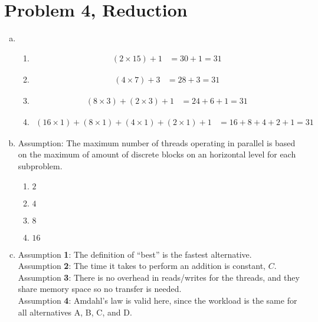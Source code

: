 \documentclass[fontsize=11pt, paper=a4, titlepage]{article}
\begin{document}
\section{Problem 4, Reduction}
\begin{enumerate}[a)]
    \item \begin{enumerate}[A]
        \item \begin{align*}
            (2\times 15) + 1 &= 30 + 1 = 31
        \end{align*}

        \item \begin{align*}
            (4\times 7) + 3 &= 28 + 3 = 31
        \end{align*}

        \item \begin{align*}
            (8\times 3) + (2\times 3) + 1 &= 24 + 6 + 1 = 31
        \end{align*}

        \item \begin{align*}
            (16\times 1) + (8\times 1) + (4\times 1) + (2\times 1) + 1 &=
            16 + 8 + 4 + 2 + 1 = 31
        \end{align*}
    \end{enumerate}

    \item Assumption: The maximum number of threads operating in parallel is
based on the maximum of amount of discrete blocks on an horizontal level for
each subproblem.
    \begin{enumerate}[A]
    \item $2$

    \item $4$

    \item $8$

    \item $16$

    \end{enumerate}

    \item Assumption \textbf{1}: The definition of ``best'' is the fastest
alternative. \\
    Assumption \textbf{2}: The time it takes to perform an addition is
constant, $C$. \\
    Assumption \textbf{3}: There is no overhead in reads/writes for the threads,
and they share memory space so no transfer is needed. \\
    Assumption \textbf{4}: Amdahl's law is valid here, since the workload is the
same for all alternatives A, B, C, and D.


\end{enumerate}
\end{document}
